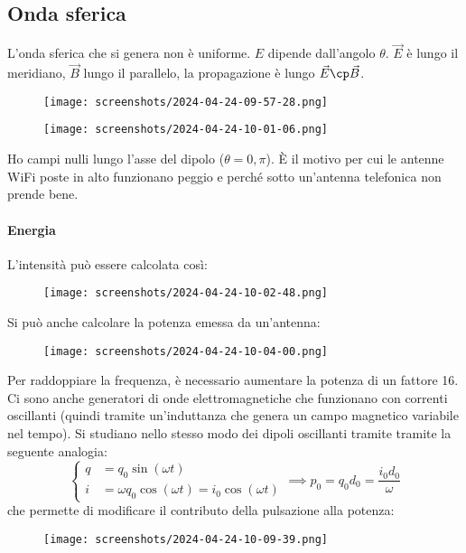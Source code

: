 \subsection{Onda sferica}
L'onda sferica che si genera non è uniforme. \(E\) dipende dall'angolo \(\theta\). \(\vec{E}\) è lungo il meridiano, \(\vec{B}\) lungo il parallelo, la propagazione è lungo \(\vec{E} \cp \vec{B}\).
\begin{figure}[H]
	\centering
	\texttt{[image: screenshots/2024-04-24-09-57-28.png]}
\end{figure}
\begin{figure}[H]
	\centering
	\texttt{[image: screenshots/2024-04-24-10-01-06.png]}
\end{figure}
Ho campi nulli lungo l'asse del dipolo (\(\theta = 0, \pi \)). È il motivo per cui le antenne WiFi poste in alto funzionano peggio e perché sotto un'antenna telefonica non prende bene.

\paragraph{Energia}
L'intensità può essere calcolata così:
\begin{figure}[H]
	\centering
	\texttt{[image: screenshots/2024-04-24-10-02-48.png]}
\end{figure}
Si può anche calcolare la potenza emessa da un'antenna:
\begin{figure}[H]
	\centering
	\texttt{[image: screenshots/2024-04-24-10-04-00.png]}
\end{figure}
Per raddoppiare la frequenza, è necessario aumentare la potenza di un fattore 16. Ci sono anche generatori di onde elettromagnetiche che funzionano con correnti oscillanti (quindi tramite un'induttanza che genera un campo magnetico variabile nel tempo). Si studiano nello stesso modo dei dipoli oscillanti tramite tramite la seguente analogia:
\begin{equation}
	\begin{cases}
		q &= q_0 \sin (\omega t)\\
		i &= \omega q_0 \cos (\omega t) = i_0 \cos (\omega t)
	\end{cases}
	\implies p_0 = q_0 d_0 = \frac{i_0 d_0}{\omega }
\end{equation}
che permette di modificare il contributo della pulsazione alla potenza:
\begin{figure}[H]
	\centering
	\texttt{[image: screenshots/2024-04-24-10-09-39.png]}
\end{figure}


